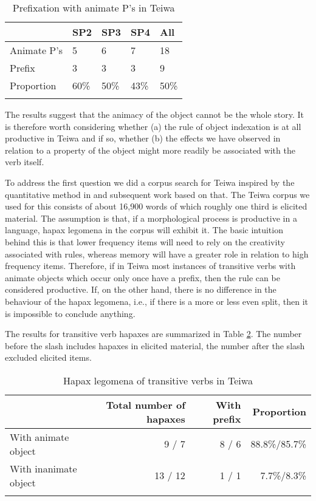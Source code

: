 \begin{table}
\caption{Prefixation with animate P's in Teiwa}
\label{tab:10:111}
\begin{tabularx}{\textwidth}{XXXXX} 
\lsptoprule
&  SP2&  SP3&  SP4&  All\\
\midrule 
Animate P's &  5&  6&  7&  18  \\
Prefix &  3&  3&  3&  9\\
Proportion &  60\%&  50\%&  43\%&  50\%\\
\lspbottomrule
\end{tabularx}
\end{table}


The results suggest that the animacy of the object cannot be the whole story. It is therefore worth considering whether (a) the rule of object indexation is at all productive in Teiwa and if so, whether (b) the effects we have observed in relation to a property of the object might more readily be associated with the verb itself. 

  To address the first question we did a corpus search for Teiwa inspired by the quantitative method in \citet{Baayen1992} and subsequent work based on that. The Teiwa corpus we used for this consists of about 16,900 words of which roughly one third is elicited material. The assumption is that, if a morphological process is productive in a language, hapax legomena in the corpus will exhibit it. The basic intuition behind this is that lower frequency items will need to rely on the creativity associated with rules, whereas memory will have a greater role in relation to high frequency items. Therefore, if in Teiwa most instances of transitive verbs with animate objects which occur only once have a prefix, then the rule can be considered productive. If, on the other hand, there is no difference in the behaviour of the hapax legomena, i.e., if there is a more or less even split, then it is impossible to conclude anything.

The results for transitive verb hapaxes are summarized in Table \ref{tab:10:112}. The number before the slash includes hapaxes in elicited material, the number after the slash excluded elicited items.

\begin{table}[h]
\caption{Hapax legomena of transitive verbs in Teiwa}
\label{tab:10:112} 
\begin{tabularx}{\textwidth}{lrrr}
\lsptoprule
& Total \mbox{number} of \mbox{hapaxes} & With prefix & Proportion\\
\midrule 
With \mbox{animate} object & 9 / 7 & 8 / 6 & 88.8\%/85.7\%\\
With \mbox{inanimate} object & 13 / 12 & 1 / 1 & 7.7\%/8.3\%\\
\lspbottomrule
\end{tabularx}
\end{table}
  


